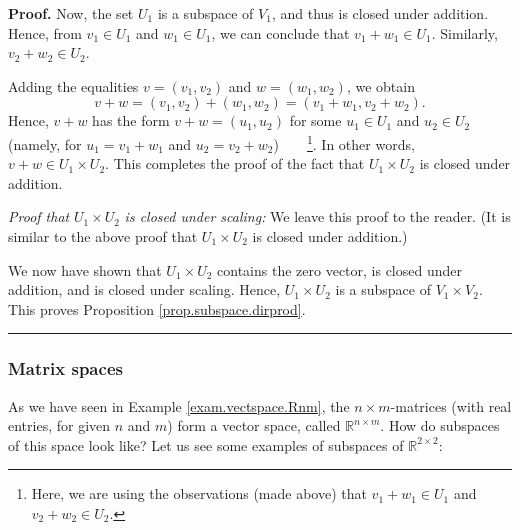 \documentclass[numbers=enddot,12pt,final,onecolumn,notitlepage]{scrartcl}%
\theoremstyle{definition}
\newenvironment{proof}[1][Proof]{\noindent\textbf{#1.} }{\ \rule{0.5em}{0.5em}}
\begin{document}
\begin{proof}
Now, the set $U_{1}$ is a subspace of $V_{1}$, and thus is closed under
addition. Hence, from $v_{1}\in U_{1}$ and $w_{1}\in U_{1}$, we can conclude
that $v_{1}+w_{1}\in U_{1}$. Similarly, $v_{2}+w_{2}\in U_{2}$.

Adding the equalities $v=\left(  v_{1},v_{2}\right)  $ and $w=\left(
w_{1},w_{2}\right)  $, we obtain%
\[
v+w=\left(  v_{1},v_{2}\right)  +\left(  w_{1},w_{2}\right)  =\left(
v_{1}+w_{1},v_{2}+w_{2}\right)  .
\]
Hence, $v+w$ has the form $v+w=\left(  u_{1},u_{2}\right)  $ for some
$u_{1}\in U_{1}$ and $u_{2}\in U_{2}$ (namely, for $u_{1}=v_{1}+w_{1}$ and
$u_{2}=v_{2}+w_{2}$)\ \ \ \ \footnote{Here, we are using the observations
(made above) that $v_{1}+w_{1}\in U_{1}$ and $v_{2}+w_{2}\in U_{2}$.}. In
other words, $v+w\in U_{1}\times U_{2}$. This completes the proof of the fact
that $U_{1}\times U_{2}$ is closed under addition.

\textit{Proof that }$U_{1}\times U_{2}$ \textit{is closed under scaling:} We
leave this proof to the reader. (It is similar to the above proof that
$U_{1}\times U_{2}$ is closed under addition.)

We now have shown that $U_{1}\times U_{2}$ contains the zero vector, is closed
under addition, and is closed under scaling. Hence, $U_{1}\times U_{2}$ is a
subspace of $V_{1}\times V_{2}$. This proves Proposition
\ref{prop.subspace.dirprod}.
\end{proof}

\subsubsection{Matrix spaces}

As we have seen in Example \ref{exam.vectspace.Rnm}, the $n \times m$-matrices
(with real entries, for given $n$ and $m$) form a vector space, called
$\mathbb{R}^{n \times m}$. How do subspaces of this space look like? Let us
see some examples of subspaces of $\mathbb{R}^{2 \times2}$:
\end{document}
